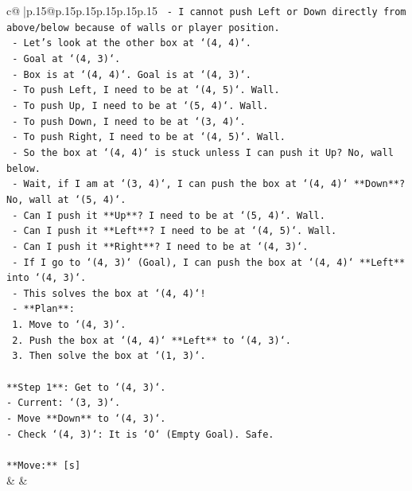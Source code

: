 \documentclass{article}
\begin{document}
{\begin{supertabular}{c@{$\;$}|p{.15\linewidth}@{}p{.15\linewidth}p{.15\linewidth}p{.15\linewidth}p{.15\linewidth}p{.15\linewidth}}
{{{\texttt{    {-} I cannot push Left or Down directly from above/below because of walls or player position.} \\
\texttt{    {-} Let's look at the other box at `(4, 4)`.} \\
\texttt{    {-} Goal at `(4, 3)`.} \\
\texttt{    {-} Box is at `(4, 4)`. Goal is at `(4, 3)`.} \\
\texttt{    {-} To push Left, I need to be at `(4, 5)`. Wall.} \\
\texttt{    {-} To push Up, I need to be at `(5, 4)`. Wall.} \\
\texttt{    {-} To push Down, I need to be at `(3, 4)`.} \\
\texttt{    {-} To push Right, I need to be at `(4, 5)`. Wall.} \\
\texttt{    {-} So the box at `(4, 4)` is stuck unless I can push it Up? No, wall below.} \\
\texttt{    {-} Wait, if I am at `(3, 4)`, I can push the box at `(4, 4)` **Down**? No, wall at `(5, 4)`.} \\
\texttt{    {-} Can I push it **Up**? I need to be at `(5, 4)`. Wall.} \\
\texttt{    {-} Can I push it **Left**? I need to be at `(4, 5)`. Wall.} \\
\texttt{    {-} Can I push it **Right**? I need to be at `(4, 3)`.} \\
\texttt{    {-} If I go to `(4, 3)` (Goal), I can push the box at `(4, 4)` **Left** into `(4, 3)`.} \\
\texttt{    {-} This solves the box at `(4, 4)`!} \\
\texttt{    {-} **Plan**:} \\
\texttt{      1. Move to `(4, 3)`.} \\
\texttt{      2. Push the box at `(4, 4)` **Left** to `(4, 3)`.} \\
\texttt{      3. Then solve the box at `(1, 3)`.} \\
\\ 
\texttt{**Step 1**: Get to `(4, 3)`.} \\
\texttt{{-} Current: `(3, 3)`.} \\
\texttt{{-} Move **Down** to `(4, 3)`.} \\
\texttt{{-} Check `(4, 3)`: It is `O` (Empty Goal). Safe.} \\
\\ 
\texttt{**Move:** {[}s{]}} \\
            }
        }
    }
    & & \\ \\


\end{supertabular}}
\end{document}
